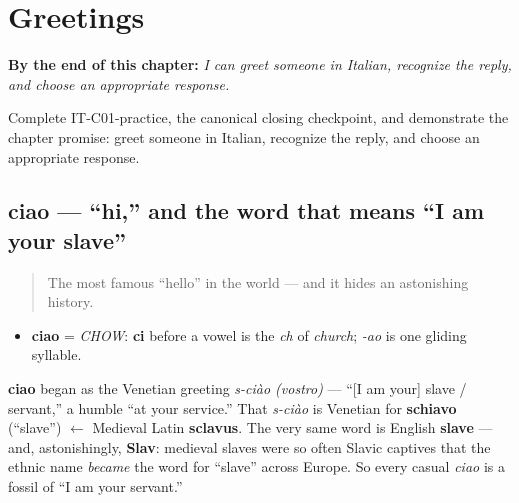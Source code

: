 
\chapter{Greetings}
\label{ch:greetings}

\begin{chapteropening}
\textbf{By the end of this chapter:} \emph{I can greet someone in Italian, recognize the reply, and choose an appropriate response.}

Complete IT-C01-practice, the canonical closing checkpoint, and demonstrate the chapter promise: greet someone in Italian, recognize the reply, and choose an appropriate response.
\end{chapteropening}

\section[ciao]{ciao — \textquotedblleft{}hi,\textquotedblright{} and the word that means \textquotedblleft{}I am your slave\textquotedblright{}}

\label{lesson:IT-C01-ciao}



\begin{quote}
The most famous \textquotedblleft{}hello\textquotedblright{} in the world — and it hides an astonishing history.
\end{quote}

\begin{sounds}
\begin{itemize}
\raggedright
  \item \textbf{ciao} = \emph{CHOW}: \textbf{ci} before a vowel is the \emph{ch} of \emph{church}; \emph{-ao} is one gliding syllable.
\end{itemize}
\end{sounds}

\begin{cousinweb}
\textbf{ciao} began as the Venetian greeting \emph{s-ciào (vostro)} — \textquotedblleft{}{[}I am your{]} slave / servant,\textquotedblright{} a humble \textquotedblleft{}at your service.\textquotedblright{} That \emph{s-ciào} is Venetian for \textbf{schiavo} (\textquotedblleft{}slave\textquotedblright{}) $\leftarrow$ Medieval Latin \textbf{sclavus}. The very same word is English \textbf{slave} — and, astonishingly, \textbf{Slav}: medieval slaves were so often Slavic captives that the ethnic name \emph{became} the word for \textquotedblleft{}slave\textquotedblright{} across Europe. So every casual \emph{ciao} is a fossil of \textquotedblleft{}I am your servant.\textquotedblright{}
\end{cousinweb}

